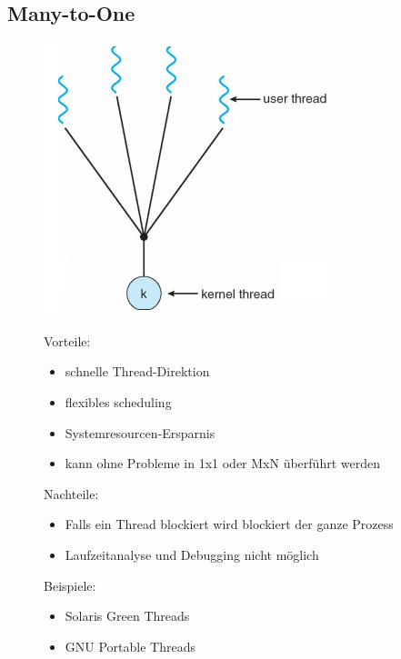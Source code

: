 \documentclass[a4paper]{scrreprt}
\begin{document}
	\subsection{Many-to-One}
	\begin{figure}[htbp]
		\begin{minipage}[t]{5cm}
			\vspace{0pt}
			\centering
			\includegraphics[scale = 0.6]{graphics/many_to_one.png}
		\end{minipage}
		\hfill
		\begin{minipage}[t]{9cm}
			\vspace{0pt}
			Vorteile:
			\begin{itemize}
				\item schnelle Thread-Direktion
				\item flexibles scheduling
				\item Systemresourcen-Ersparnis
				\item kann ohne Probleme in 1x1 oder MxN überführt werden
			\end{itemize}
			Nachteile:
			\begin{itemize}
				\item Falls ein Thread blockiert wird blockiert der ganze Prozess
				\item Laufzeitanalyse und Debugging nicht möglich
			\end{itemize}
			Beispiele:
			\begin{itemize}
				\item Solaris Green Threads
				\item GNU Portable Threads
			\end{itemize}
		\end{minipage}
	\end{figure}
	
\end{document}
